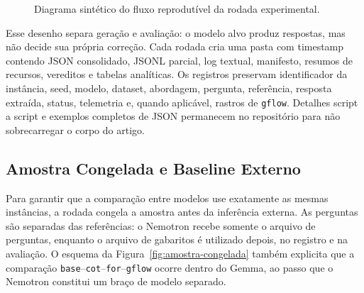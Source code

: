 \documentclass[12pt]{article}
\begin{document}
\begin{figure}[ht]
\centering
{}
\caption{Diagrama sint\'etico do fluxo reprodut\'ivel da rodada experimental.}
\label{fig:fluxo-ilustrado}
\end{figure}

Esse desenho separa geração e avaliação: o modelo alvo produz respostas, mas não decide sua própria correção. Cada rodada cria uma pasta com timestamp contendo JSON consolidado, JSONL parcial, log textual, manifesto, resumos de recursos, vereditos e tabelas analíticas. Os registros preservam identificador da instância, seed, modelo, dataset, abordagem, pergunta, referência, resposta extraída, status, telemetria e, quando aplicável, rastros de \texttt{gflow}. Detalhes script a script e exemplos completos de JSON permanecem no repositório para não sobrecarregar o corpo do artigo.

\subsection{Amostra Congelada e Baseline Externo}

Para garantir que a compara\c{c}\~ao entre modelos use exatamente as mesmas inst\^ancias, a rodada congela a amostra antes da infer\^encia externa. As perguntas s\~ao separadas das refer\^encias: o Nemotron recebe somente o arquivo de perguntas, enquanto o arquivo de gabaritos \'{e} utilizado depois, no registro e na avalia\c{c}\~ao. O esquema da Figura~\ref{fig:amostra-congelada} tamb\'em explicita que a compara\c{c}\~ao \texttt{base}--\texttt{cot}--\texttt{for}--\texttt{gflow} ocorre dentro do Gemma, ao passo que o Nemotron constitui um bra\c{c}o de modelo separado.
\end{document}
